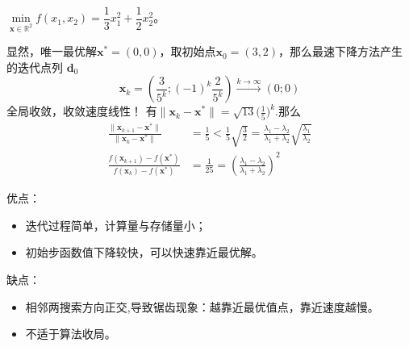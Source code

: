 \begin{example}
    $\min\limits_{\boldsymbol{x}\in\mathbb{R}^2}f(x_1,x_2) = \dfrac{1}{3}x_{1}^2+\dfrac{1}{2}x_2^2$。
    
    显然，唯一最优解$\boldsymbol{x}^* = \left( 0,0 \right)$，取初始点$\boldsymbol{x}_0 = (3,2)$，那么最速下降方法产生的迭代点列
    $\boldsymbol{d}_0$
    \[
        \boldsymbol{x}_{k}=\left(\frac{3}{5^{k}};(-1)^{k}\frac{2}{5^{k}}\right)\overset{k\to\infty}{\longrightarrow}(0;0)
    \]
    全局收敛，收敛速度线性！
    有$\|\boldsymbol{x}_k-\boldsymbol{x}^*\|=\sqrt{13}\big(\frac15\big)^k.$那么
    \[
        \begin{aligned}
            \frac{\|\boldsymbol{x}_{k+1}-\boldsymbol{x}^*\|}{\|\boldsymbol{x}_k-\boldsymbol{x}^*\|} & =\frac15<\frac15\sqrt{\frac32}=\frac{\lambda_1-\lambda_2}{\lambda_1+\lambda_2}\sqrt{\frac{\lambda_1}{\lambda_2}}\\
            \frac{f(\boldsymbol{x}_{k+1})-f(\boldsymbol{x}^*)}{f(\boldsymbol{x}_k)-f(\boldsymbol{x}^*)} & =\frac1{25}=\left(\frac{\lambda_1-\lambda_2}{\lambda_1+\lambda_2}\right)^2
        \end{aligned}
    \]
\end{example}
\begin{note}
    优点：
    \begin{itemize}
        \item 迭代过程简单，计算量与存储量小；
        \item 初始步函数值下降较快，可以快速靠近最优解。
    \end{itemize}

    缺点：
    \begin{itemize}
        \item 相邻两搜索方向正交,导致锯齿现象：越靠近最优值点，靠近速度越慢。
        \item 不适于算法收局。
    \end{itemize}
\end{note}

